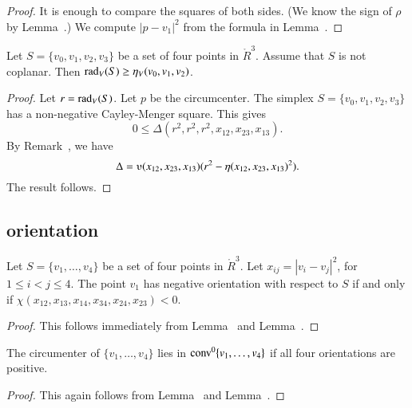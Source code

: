 \begin{proof} It is enough to compare the
squares of both sides.  (We know the sign of
$\rho$ by Lemma~.)  We
compute $|p-v_1|^2$ from the formula
in Lemma~.
\end{proof}
\newpage

\begin{lemma}
Let $S=\{v_0,v_1,v_2,v_3\}$ be a set of four points in $\ring{R}^3$.
Assume that $S$ is not coplanar.
Then $\operatorname{rad}_V(S) \ge \eta_V(v_0,v_1,v_2)$.
\end{lemma}

\begin{proof}  Let $r=\operatorname{rad}_V(S)$.  Let $p$ be the circumcenter.
The simplex $S=\{v_0,v_1,v_2,v_3\}$ has a non-negative 
Cayley-Menger
square.  This gives
  $$
  0\le \Delta(r^2,r^2,r^2,x_{12},x_{23},x_{13}).
  $$
By Remark~, we have
$$
\Delta = \ups(x_{12},x_{23},x_{13}) (r^2 - \eta(x_{12},x_{23},x_{13})^2).
$$
The result follows.
\end{proof}


\newpage
\subsection{orientation}



\begin{lemma} 
Let $S=\{v_1,\ldots,v_4\}$ be a set of four points
in $\ring{R}^3$.  
Let $x_{ij}=|v_i-v_j|^2$, for $1\le i< j\le 4$.
The point $v_1$ has negative
orientation with respect to $S$ if and only if
    $\chi(x_{12},x_{13},x_{14},x_{34},x_{24},
    x_{23})<0$.
\end{lemma}

\begin{proof} 
This follows immediately from  Lemma~ and 
Lemma~.
\end{proof}

\begin{lemma}
The circumenter of $\{v_1,\ldots,v_4\}$ lies in
${\operatorname{conv}}^0\{v_1,\ldots,v_4\}$ if all four
orientations are positive.
\end{lemma}

\begin{proof}  This again follows from
Lemma~ and 
Lemma~.
\end{proof}


